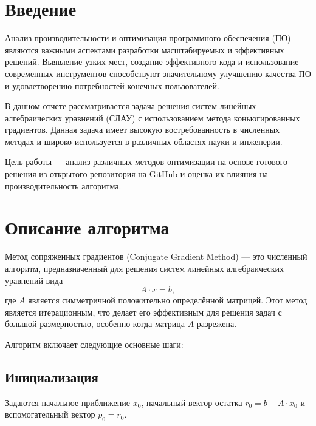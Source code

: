 \documentclass[12pt]{extarticle}
\begin{document}
    \begin{spacing}{1.5}


    \tableofcontents
    \thispagestyle{empty}
    \newpage

    \pagestyle{plain}
    \setcounter{page}{3}

    \newpage
    \section{Введение}

    Анализ производительности и оптимизация программного обеспечения (ПО) являются важными аспектами разработки масштабируемых и эффективных решений. Выявление узких мест, создание эффективного кода и использование современных инструментов способствуют значительному улучшению качества ПО и удовлетворению потребностей конечных пользователей.

    В данном отчете рассматривается задача решения систем линейных алгебраических уравнений (СЛАУ) с использованием метода коньюгированных градиентов. Данная задача имеет высокую востребованность в численных методах и широко используется в различных областях науки и инженерии.

    Цель работы — анализ различных методов оптимизации на основе готового решения из открытого репозитория на GitHub и оценка их влияния на производительность алгоритма.

    \newpage
    \section{Описание алгоритма}

    Метод сопряженных градиентов (Conjugate Gradient Method) — это численный алгоритм, предназначенный для решения систем линейных алгебраических уравнений вида 
    \[
    A \cdot x = b,
    \]
    где \(A\) является симметричной положительно определённой матрицей. Этот метод является итерационным, что делает его эффективным для решения задач с большой размерностью, особенно когда матрица \(A\) разрежена.

    Алгоритм включает следующие основные шаги:

    \subsection{Инициализация}
    Задаются начальное приближение \(x_0\), начальный вектор остатка \(r_0 = b - A \cdot x_0\) и вспомогательный вектор \(p_0 = r_0\).


\end{spacing}
\end{document}
